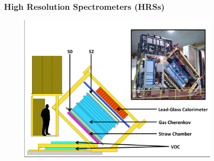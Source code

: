 \documentclass[12pt]{beamer}
\begin{document}
\begin{frame}
\frametitle{High Resolution Spectrometers (HRSs)}
	\begin{figure}
		\includegraphics[width=10cm]{../images/HRS_cartoon}
	\end{figure}
\end{frame}





\end{document}
